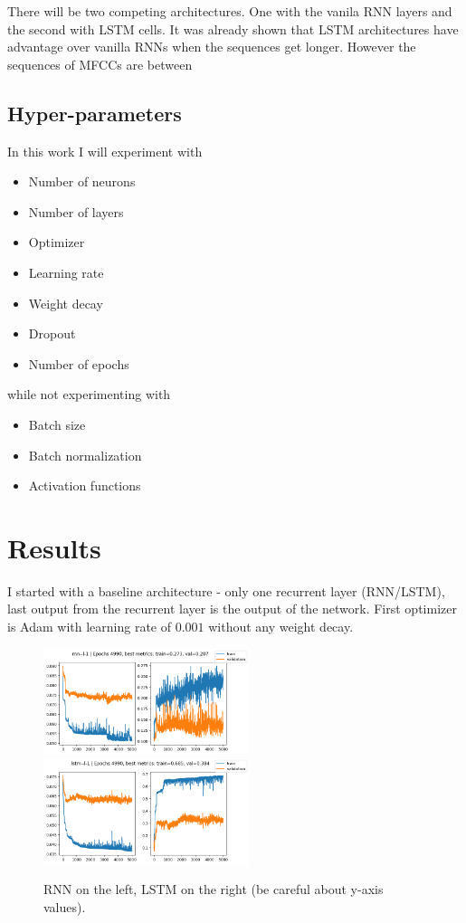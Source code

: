 \documentclass[a4paper,10pt]{article}
\begin{document}
There will be two competing architectures. One with the vanila RNN layers and the second with LSTM cells.
It was already shown that LSTM architectures have advantage over vanilla RNNs when the sequences get longer.
However the sequences of MFCCs are between 

\subsection{Hyper-parameters}

In this work I will experiment with

\begin{itemize}
  \item Number of neurons
  \item Number of layers 
  \item Optimizer
  \item Learning rate
  \item Weight decay
  \item Dropout
  \item Number of epochs
\end{itemize}

while not experimenting with

\begin{itemize}
  \item Batch size
  \item Batch normalization
  \item Activation functions
\end{itemize}

\section{Results}

I started with a baseline architecture - only one recurrent layer (RNN/LSTM), last output from the recurrent layer is the output of the network.
First optimizer is Adam with learning rate of $0.001$ without any weight decay.

\begin{figure}[H]
      \begin{center}
            \includegraphics[width=6cm]{figures/rnn--l-1--e-5000.png}
            \includegraphics[width=6cm]{figures/lstm-l-1--e-5000.png}
      \end{center}
      \caption{RNN on the left, LSTM on the right (be careful about y-axis values).}
      \label{fig1}
\end{figure}
\end{document}
